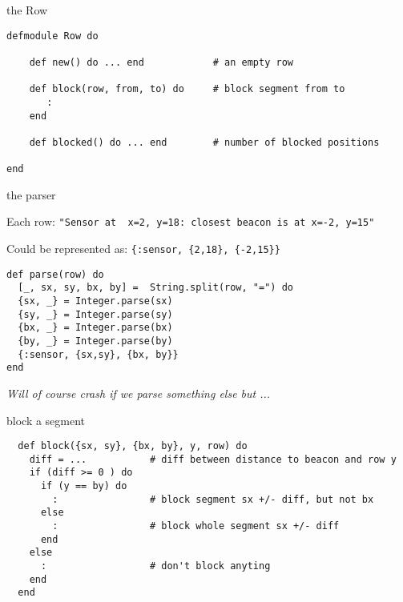 \begin{frame}[fragile]{the Row}

  \begin{verbatim}
defmodule Row do

    def new() do ... end            # an empty row

    def block(row, from, to) do     # block segment from to 
       :
    end

    def blocked() do ... end        # number of blocked positions

end
  \end{verbatim}
  
\end{frame}

\begin{frame}[fragile]{the parser}

  Each row: \pause   \verb+"Sensor at  x=2, y=18: closest beacon is at x=-2, y=15"+
  \vspace{20pt} \pause

  Could be represented as:  \pause  \verb+{:sensor, {2,18}, {-2,15}}+

  \vspace{20pt} \pause
  
  \begin{verbatim}
def parse(row) do
  [_, sx, sy, bx, by] =  String.split(row, "=") do 
  {sx, _} = Integer.parse(sx)
  {sy, _} = Integer.parse(sy)
  {bx, _} = Integer.parse(bx)  
  {by, _} = Integer.parse(by)
  {:sensor, {sx,sy}, {bx, by}}
end
\end{verbatim}

  \vspace{20pt}\pause
  {\em Will of course crash if we parse something else but ...} 
  
\end{frame}

\begin{frame}[fragile]{block a segment}

  \begin{verbatim}
  def block({sx, sy}, {bx, by}, y, row) do
    diff = ...           # diff between distance to beacon and row y
    if (diff >= 0 ) do
      if (y == by) do
        :                # block segment sx +/- diff, but not bx
      else
        :                # block whole segment sx +/- diff
      end
    else
      :                  # don't block anyting
    end
  end
\end{verbatim}
  
\end{frame}


